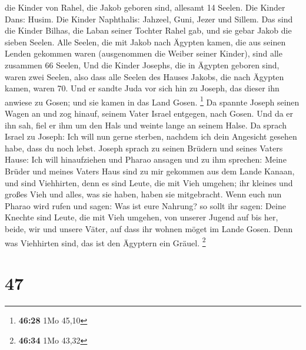 die Kinder von Rahel, die Jakob geboren sind, allesamt 14 Seelen.
 Die Kinder Dans: Husim.  Die Kinder
Naphthalis: Jahzeel, Guni, Jezer und Sillem.  Das sind die
Kinder Bilhas, die Laban seiner Tochter Rahel gab, und sie gebar Jakob
die sieben Seelen.  Alle Seelen, die mit Jakob nach Ägypten
kamen, die aus seinen Lenden gekommen waren (ausgenommen die Weiber
seiner Kinder), sind alle zusammen 66 Seelen,  Und die
Kinder Josephs, die in Ägypten geboren sind, waren zwei Seelen, also
dass alle Seelen des Hauses Jakobs, die nach Ägypten kamen, waren 70.
 Und er sandte Juda vor sich hin zu Joseph, das dieser ihn
anwiese zu Gosen; und sie kamen in das Land Gosen. \footnote{\textbf{46:28}
  1Mo 45,10}  Da spannte Joseph seinen Wagen an und zog
hinauf, seinem Vater Israel entgegen, nach Gosen. Und da er ihn sah,
fiel er ihm um den Hals und weinte lange an seinem Halse. 
Da sprach Israel zu Joseph: Ich will nun gerne sterben, nachdem ich dein
Angesicht gesehen habe, dass du noch lebst.  Joseph sprach
zu seinen Brüdern und seines Vaters Hause: Ich will hinaufziehen und
Pharao ansagen und zu ihm sprechen: Meine Brüder und meines Vaters Haus
sind zu mir gekommen aus dem Lande Kanaan,  und sind
Viehhirten, denn es sind Leute, die mit Vieh umgehen; ihr kleines und
großes Vieh und alles, was sie haben, haben sie mitgebracht.
 Wenn euch nun Pharao wird rufen und sagen: Was ist eure
Nahrung?  so sollt ihr sagen: Deine Knechte sind Leute, die
mit Vieh umgehen, von unserer Jugend auf bis her, beide, wir und unsere
Väter, auf dass ihr wohnen möget im Lande Gosen. Denn was Viehhirten
sind, das ist den Ägyptern ein Gräuel. \footnote{\textbf{46:34} 1Mo
  43,32}

\hypertarget{section-11}{%
\section{47}\label{section-11}}

